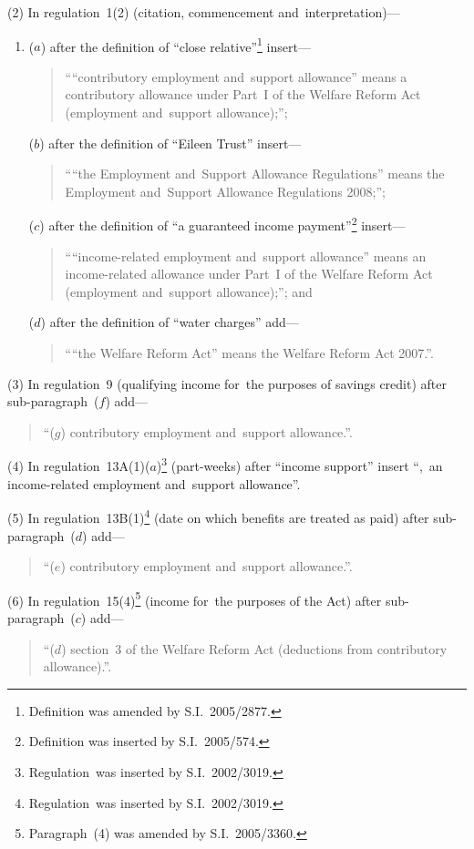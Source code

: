 \documentclass[12pt,a4paper]{article}
\begin{document}
(2) In regulation~1(2) (citation, commencement and~interpretation)—
\begin{enumerate}\item[]
($a$) after the definition of “close relative”\footnote{Definition was amended by S.I.~2005/2877.} insert—
\begin{quotation}
““contributory employment and~support allowance” means a contributory allowance under Part~I of the Welfare Reform Act (employment and~support allowance);”;
\end{quotation}

($b$) after the definition of “Eileen Trust” insert—
\begin{quotation}
““the Employment and~Support Allowance Regulations” means the Employment and~Support Allowance Regulations 2008;”;
\end{quotation}

($c$) after the definition of “a guaranteed income payment”\footnote{Definition was inserted by S.I.~2005/574.} insert—
\begin{quotation}\sloppy
““income-related employment and~support allowance” means an income-related allowance under Part~I of the Welfare Reform Act (employment and~support allowance);”; and
\end{quotation}

($d$) after the definition of “water charges” add—
\begin{quotation}
““the Welfare Reform Act” means the Welfare Reform Act 2007.”.
\end{quotation}
\end{enumerate}

(3) In regulation~9 (qualifying income for~the purposes of savings credit) after sub-paragraph~($f$)  add—
\begin{quotation}
“($g$) contributory employment and~support allowance.”.
\end{quotation}

(4) In regulation~13A(1)($a$)\footnote{Regulation~was inserted by S.I.~2002/3019.} (part-weeks) after “income support” insert “,~an income-related employment and~support allowance”.

(5) In regulation~13B(1)\footnote{Regulation~was inserted by S.I.~2002/3019.} (date on which benefits are treated as paid) after sub-paragraph~($d$)  add—
\begin{quotation}
“($e$) contributory employment and~support allowance.”.
\end{quotation}

(6) In regulation~15(4)\footnote{Paragraph~(4) was amended by S.I.~2005/3360.} (income for~the purposes of the Act) after sub-paragraph~($c$)  add—
\begin{quotation}
“($d$) section~3 of the Welfare Reform Act (deductions from contributory allowance).”.
\end{quotation}
\end{document}
